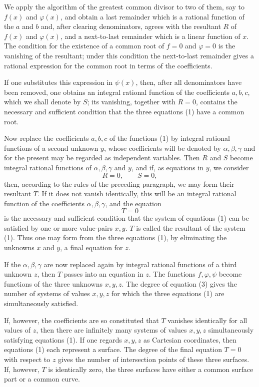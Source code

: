 \documentclass[11pt]{article}
\begin{document}
We apply the algorithm of the greatest common divisor to two of them, say to $f(x)$ and $\varphi(x)$, and obtain a last remainder which is a rational function of the $a$ and $b$ and, after clearing denominators, agrees with the resultant $R$ of $f(x)$ and $\varphi(x)$, and a next-to-last remainder which is a linear function of $x$. The condition for the existence of a common root of $f=0$ and $\varphi=0$ is the vanishing of the resultant; under this condition the next-to-last remainder gives a rational expression for the common root in terms of the coefficients.

If one substitutes this expression in $\psi(x)$, then, after all denominators have been removed, one obtains an integral rational function of the coefficients $a,b,c$, which we shall denote by $S$; its vanishing, together with $R=0$, contains the necessary and sufficient condition that the three equations (1) have a common root.

Now replace the coefficients $a,b,c$ of the functions (1) by integral rational functions of a second unknown $y$, whose coefficients will be denoted by $\alpha,\beta,\gamma$ and for the present may be regarded as independent variables. Then $R$ and $S$ become integral rational functions of $\alpha,\beta,\gamma$ and $y$, and if, as equations in $y$, we consider
\begin{equation}
R=0,
\qquad
S=0,
\tag{2}
\end{equation}
then, according to the rules of the preceding paragraph, we may form their resultant $T$. If it does not vanish identically, this will be an integral rational function of the coefficients $\alpha,\beta,\gamma$, and the equation
\begin{equation}
T=0
\tag{3}
\end{equation}
is the necessary and sufficient condition that the system of equations (1) can be satisfied by one or more value-pairs $x,y$. $T$ is called the resultant of the system (1). Thus one may form from the three equations (1), by eliminating the unknowns $x$ and $y$, a final equation for $z$.

If the $\alpha,\beta,\gamma$ are now replaced again by integral rational functions of a third unknown $z$, then $T$ passes into an equation in $z$. The functions $f,\varphi,\psi$ become functions of the three unknowns $x,y,z$. The degree of equation (3) gives the number of systems of values $x,y,z$ for which the three equations (1) are simultaneously satisfied.

If, however, the coefficients are so constituted that $T$ vanishes identically for all values of $z$, then there are infinitely many systems of values $x,y,z$ simultaneously satisfying equations (1). If one regards $x,y,z$ as Cartesian coordinates, then equations (1) each represent a surface. The degree of the final equation $T=0$ with respect to $z$ gives the number of intersection points of these three surfaces. If, however, $T$ is identically zero, the three surfaces have either a common surface part or a common curve.
\end{document}

